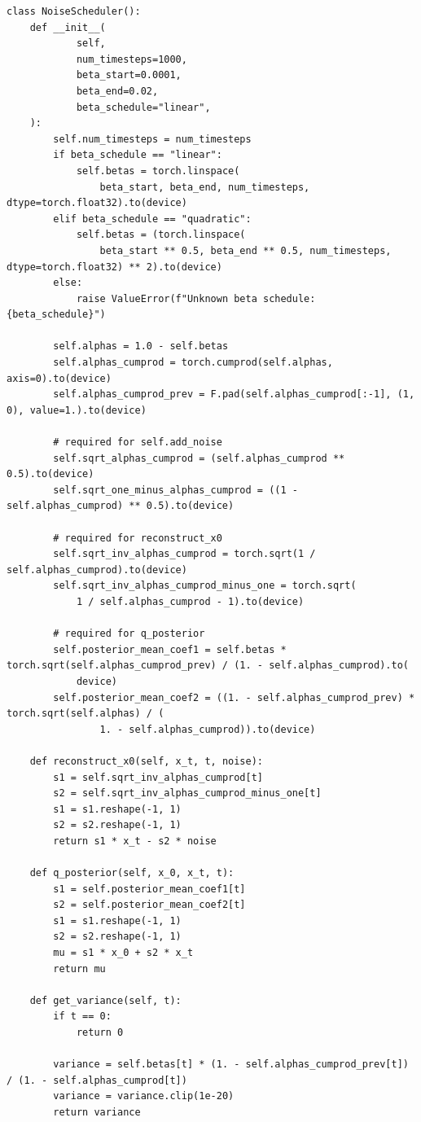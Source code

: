 \begin{appendices}
\begin{tcolorbox}[breakable,colback=orange!5!white, colframe=orange!80!black, title=Generalized Idea Generation System and User Prompt]
\begin{Verbatim}[breaklines, breaksymbol={}, breaksymbolleft={}, fontsize=\small]
class NoiseScheduler():
    def __init__(
            self,
            num_timesteps=1000,
            beta_start=0.0001,
            beta_end=0.02,
            beta_schedule="linear",
    ):
        self.num_timesteps = num_timesteps
        if beta_schedule == "linear":
            self.betas = torch.linspace(
                beta_start, beta_end, num_timesteps, dtype=torch.float32).to(device)
        elif beta_schedule == "quadratic":
            self.betas = (torch.linspace(
                beta_start ** 0.5, beta_end ** 0.5, num_timesteps, dtype=torch.float32) ** 2).to(device)
        else:
            raise ValueError(f"Unknown beta schedule: {beta_schedule}")

        self.alphas = 1.0 - self.betas
        self.alphas_cumprod = torch.cumprod(self.alphas, axis=0).to(device)
        self.alphas_cumprod_prev = F.pad(self.alphas_cumprod[:-1], (1, 0), value=1.).to(device)

        # required for self.add_noise
        self.sqrt_alphas_cumprod = (self.alphas_cumprod ** 0.5).to(device)
        self.sqrt_one_minus_alphas_cumprod = ((1 - self.alphas_cumprod) ** 0.5).to(device)

        # required for reconstruct_x0
        self.sqrt_inv_alphas_cumprod = torch.sqrt(1 / self.alphas_cumprod).to(device)
        self.sqrt_inv_alphas_cumprod_minus_one = torch.sqrt(
            1 / self.alphas_cumprod - 1).to(device)

        # required for q_posterior
        self.posterior_mean_coef1 = self.betas * torch.sqrt(self.alphas_cumprod_prev) / (1. - self.alphas_cumprod).to(
            device)
        self.posterior_mean_coef2 = ((1. - self.alphas_cumprod_prev) * torch.sqrt(self.alphas) / (
                1. - self.alphas_cumprod)).to(device)

    def reconstruct_x0(self, x_t, t, noise):
        s1 = self.sqrt_inv_alphas_cumprod[t]
        s2 = self.sqrt_inv_alphas_cumprod_minus_one[t]
        s1 = s1.reshape(-1, 1)
        s2 = s2.reshape(-1, 1)
        return s1 * x_t - s2 * noise

    def q_posterior(self, x_0, x_t, t):
        s1 = self.posterior_mean_coef1[t]
        s2 = self.posterior_mean_coef2[t]
        s1 = s1.reshape(-1, 1)
        s2 = s2.reshape(-1, 1)
        mu = s1 * x_0 + s2 * x_t
        return mu

    def get_variance(self, t):
        if t == 0:
            return 0

        variance = self.betas[t] * (1. - self.alphas_cumprod_prev[t]) / (1. - self.alphas_cumprod[t])
        variance = variance.clip(1e-20)
        return variance


\end{Verbatim}
\end{tcolorbox}
\end{appendices}
